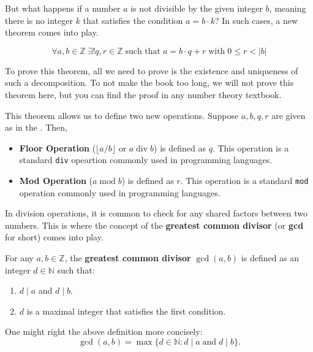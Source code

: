 \documentclass[../lecture-notes.tex]{subfiles}
\begin{document}
But what happens if a number $a$ is not divisible by the given integer $b$, meaning there is no integer $k$ that satisfies the condition $a = b \cdot k$? In such cases, a new theorem comes into play.

\begin{theorem}\label{th:division}
    \begin{equation*}
        \forall a, b \in \mathbb{Z} \; \exists! q, r \in \mathbb{Z} \; \text{such that} \; a = b \cdot q + r \; \text{with} \; 0 \leq r < |b|
    \end{equation*}
\end{theorem}

To prove this theorem, all we need to prove is the existence and uniqueness of
such a decomposition. To not make the book too long, we will not prove this
theorem here, but you can find the proof in any number theory textbook.

This theorem allows us to define two new operations. Suppose $a,b,q,r$ are given
as in the . Then,
\begin{itemize}
    \item \textbf{Floor Operation} ($\lfloor a/b \rfloor$ or $a \; \text{div} \;
b$) is defined as $q$. This operation is a standard \texttt{div} opeartion
commonly used in programming languages.
    \item \textbf{Mod Operation} ($a \; \text{mod} \; b$) is defined as $r$. This operation is a standard
\texttt{mod} operation commonly used in programming languages. 
\end{itemize}

In division operations, it is common to check for any shared factors between two
numbers. This is where the concept of the \textbf{greatest common divisor} (or
\textbf{gcd} for short) comes into play.

\begin{definition}[GCD]
    For any $a, b \in \mathbb{Z}$, the \textbf{greatest common divisor} $\gcd(a, b)$ is defined as an integer $d \in \mathbb{N}$ such that:
    \begin{enumerate}
        \item $d \mid a$ and $d \mid b$.
        \item $d$ is a maximal integer that satisfies the first condition.
    \end{enumerate}

    One might right the above definition more concisely:
    \begin{equation*}
        \gcd(a,b) = \max\{d \in \mathbb{N}: d \mid a \; \text{and} \; d \mid b\}.
    \end{equation*}
\end{definition}
\end{document}
